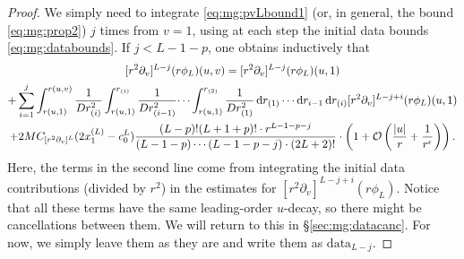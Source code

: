 \documentclass[11pt,english]{article}
\numberwithin{equation}{section}
\theoremstyle{remark}
\theoremstyle{plain}
\theoremstyle{remark}
\newcommand{\dd}{\mathop{}\!\mathrm{d}}
\newcommand{\pv}{\partial_v}
\renewcommand{\(}{\left(}
\renewcommand{\)}{\right)}
\begin{document}
\begin{proof}
We simply need to integrate \eqref{eq:mg:pvLbound1} (or, in general, the bound \eqref{eq:mg:prop2}) $j$ times from $v=1$, using at each step the initial data bounds \eqref{eq:mg:databounds}.
If $j<L-1-p$, one obtains inductively that
\begin{multline}\label{eq:mgxxx}
[r^2\pv]^{L-j}(r\phi_L)(u,v)=[r^2\pv]^{L-j}(r\phi_L)(u,1)\\
+\sum_{i=1}^j 
\int_{r(u,1)}^{r(u,v)}\frac{1}{Dr_{(i)}^2}\int_{r(u,1)}^{r_{(i)}}\frac{1}{Dr_{(i-1)}^2}\dots\int_{r(u,1)}^{r_{(2)}}\frac{1}{Dr_{(1)}^2}\dd r_{(1)}\cdots\dd r_{i-1}\dd r_{(i)}[r^2\pv]^{L-j+i}(r\phi_L)(u,1)\\
+2M\cv{L}(2x_1^{(L)}-c_0^L)\frac{(L-p)!(L+1+p)!\cdot r^{L-1-p-j}}{(L-1-p)\cdots (L-1-p-j)\cdot(2L+2)!} 
\cdot \left(1+\mathcal O\left(\frac{|u|}{r}+\frac{1}{r^{\epsilon}}\right)\right).
\end{multline}
Here, the terms in the second line come from integrating the initial data contributions (divided by $r^2$) in the estimates for $[r^2\pv]^{L-j+i}(r\phi_L)$. 
Notice that all these terms have the same leading-order $u$-decay, so there might be cancellations between them. 
We will return to this in \S\ref{sec:mg:datacanc}.
 For now, we  simply leave them as they are and write them as $\mathrm{data}_{L-j}$.


\end{proof}
\end{document}
